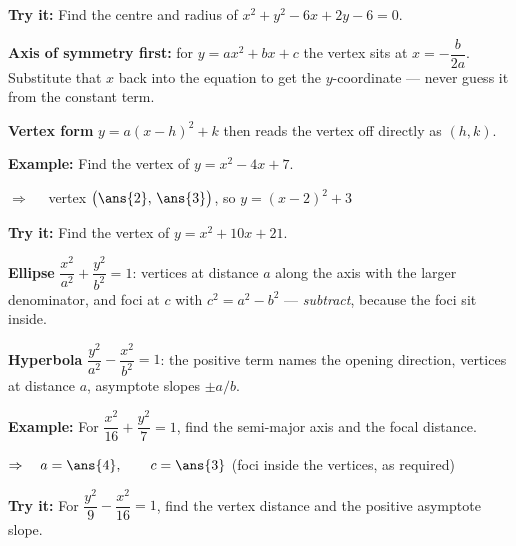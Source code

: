 \documentclass[12pt]{article}
\begin{document}
\begin{tryitbox}
\textbf{Try it:} \quad Find the centre and radius of $x^2 + y^2 - 6x + 2y - 6 = 0$.\\[2pt]
\end{tryitbox}


\begin{formulabox}
\textbf{Axis of symmetry first:} for $y = ax^2 + bx + c$ the vertex sits at
$x = -\dfrac{b}{2a}$. Substitute that $x$ back into the equation to get the $y$-coordinate ---
never guess it from the constant term.\par
\textbf{Vertex form} $y = a(x-h)^2 + k$ then reads the vertex off directly as $(h, k)$.
\end{formulabox}

\begin{examplebox}
\textbf{Example:} \quad Find the vertex of $y = x^2 - 4x + 7$.

$\Rightarrow\quad$ vertex $\bigl(\ans{2},\, \ans{3}\bigr)$, so $y = (x-2)^2 + 3$
\end{examplebox}

\begin{tryitbox}
\textbf{Try it:} \quad Find the vertex of $y = x^2 + 10x + 21$.\\[2pt]
\end{tryitbox}


\begin{formulabox}
\textbf{Ellipse} $\dfrac{x^2}{a^2} + \dfrac{y^2}{b^2} = 1$: vertices at distance $a$ along the
axis with the larger denominator, and foci at $c$ with $c^2 = a^2 - b^2$ --- \emph{subtract},
because the foci sit inside.\par
\textbf{Hyperbola} $\dfrac{y^2}{a^2} - \dfrac{x^2}{b^2} = 1$: the positive term names the
opening direction, vertices at distance $a$, asymptote slopes $\pm a/b$.
\end{formulabox}

\begin{examplebox}
\textbf{Example:} \quad For $\dfrac{x^2}{16} + \dfrac{y^2}{7} = 1$, find the semi-major axis and the focal distance.

$\Rightarrow\quad a = \ans{4}, \qquad c = \ans{3}$ \quad (foci inside the vertices, as required)
\end{examplebox}

\begin{tryitbox}
\textbf{Try it:} \quad For $\dfrac{y^2}{9} - \dfrac{x^2}{16} = 1$, find the vertex distance and the positive asymptote slope.\\[2pt]
\end{tryitbox}
\end{document}

